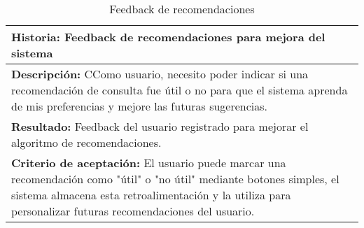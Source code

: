 \documentclass[11pt]{article}
\begin{document}
\begin{table}[H]
    \centering
    \begin{tabular}{|p{15cm}|}
    \hline
    \textbf{Historia: } Feedback de recomendaciones para mejora del sistema\\
    \hline
    \textbf{Descripción: }CComo usuario, necesito poder indicar si una recomendación de consulta fue útil o
     no para que el sistema aprenda de mis preferencias y mejore las futuras sugerencias.\\
    \hline
    \textbf{Resultado: } Feedback del usuario registrado para mejorar el algoritmo de recomendaciones.\\
    \hline
    \textbf{Criterio de aceptación: } El usuario puede marcar una recomendación como "útil" o "no útil" mediante botones simples, 
    el sistema almacena esta retroalimentación y la utiliza para personalizar futuras recomendaciones del usuario.\\
    \hline
    \end{tabular}
    \caption{Feedback de recomendaciones}
    \label{user-story10}
\end{table}
\pagebreak
\printbibliography[heading=bibintoc]
\end{document}
